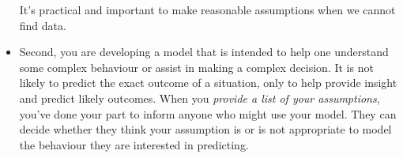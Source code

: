 \begin{siam}
\begin{example}
\begin{itemize}
		It's practical and important to make reasonable assumptions when we cannot find data.

	\item Second, you are developing a model that is intended to help one understand some complex behaviour or assist in making a complex decision. It is not likely to predict the exact outcome of a situation, only to help provide insight and predict likely outcomes. When you \emph{provide a list of your assumptions}, you've done your part to inform anyone who might use your model. They can decide whether they think your assumption is or is not appropriate to model the behaviour they are interested in predicting.

\end{itemize} 


   
	
\end{example}
\end{siam}





